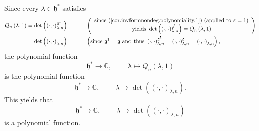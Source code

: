\documentclass
[numbers=enddot,12pt,final,onecolumn,german,notitlepage]{scrartcl}%
\theoremstyle{definition}
\begin{document}
Since every $\lambda\in\mathfrak{h}^{\ast}$ satisfies%
\begin{align*}
Q_{n}\left(  \lambda,1\right)   &  =\det\left(  \left(  \cdot,\cdot\right)
_{\lambda,n}^{\mathfrak{g}^{1}}\right)  \ \ \ \ \ \ \ \ \ \ \left(
\begin{array}
[c]{c}%
\text{since (\ref{cor.invformnondeg.polynomiality.1}) (applied to }%
\varepsilon=1\text{)}\\
\text{yields }\det\left(  \left(  \cdot,\cdot\right)  _{\lambda,n}%
^{\mathfrak{g}^{1}}\right)  =Q_{n}\left(  \lambda,1\right)
\end{array}
\right) \\
&  =\det\left(  \left(  \cdot,\cdot\right)  _{\lambda,n}\right)
\ \ \ \ \ \ \ \ \ \ \left(  \text{since }\mathfrak{g}^{1}=\mathfrak{g}\text{
and thus }\left(  \cdot,\cdot\right)  _{\lambda,n}^{\mathfrak{g}^{1}}=\left(
\cdot,\cdot\right)  _{\lambda,n}^{\mathfrak{g}}=\left(  \cdot,\cdot\right)
_{\lambda,n}\right)  ,
\end{align*}
the polynomial function%
\[
\mathfrak{h}^{\ast}\rightarrow\mathbb{C},\ \ \ \ \ \ \ \ \ \ \lambda\mapsto
Q_{n}\left(  \lambda,1\right)
\]
is the polynomial function%
\[
\mathfrak{h}^{\ast}\rightarrow\mathbb{C},\ \ \ \ \ \ \ \ \ \ \lambda
\mapsto\det\left(  \left(  \cdot,\cdot\right)  _{\lambda,n}\right)  .
\]
This yields that%
\[
\mathfrak{h}^{\ast}\rightarrow\mathbb{C},\ \ \ \ \ \ \ \ \ \ \lambda
\mapsto\det\left(  \left(  \cdot,\cdot\right)  _{\lambda,n}\right)
\]
is a polynomial function.
\end{document}
